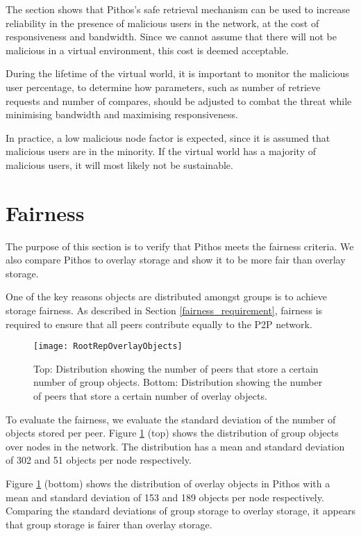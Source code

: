 The section shows that Pithos's safe retrieval mechanism can be used to increase reliability in the presence of malicious users in the network, at the cost of responsiveness and bandwidth. Since we cannot assume that there will not be malicious in a virtual environment, this cost is deemed acceptable.

During the lifetime of the virtual world, it is important to monitor the malicious user percentage, to determine how parameters, such as number of retrieve requests and number of compares, should be adjusted to combat the threat while minimising bandwidth and maximising responsiveness.

In practice, a low malicious node factor is expected, since it is assumed that malicious users are in the minority. If the virtual world has a majority of malicious users, it will most likely not be sustainable.

\section{Fairness}

The purpose of this section is to verify that Pithos meets the fairness criteria. We also compare Pithos to overlay storage and show it to be more fair than overlay storage.

One of the key reasons objects are distributed amongst groups is to achieve storage fairness. As described in Section \ref{fairness_requirement}, fairness is required to ensure that all peers contribute equally to the P2P network.

\begin{figure}[htbp]
 \centering
 \texttt{[image: RootRepOverlayObjects]}
 \caption{Top: Distribution showing the number of peers that store a certain number of group objects. Bottom: Distribution showing the number of peers that store a certain number of overlay objects.}
 \label{fig_group_overlay_objects}
\end{figure}
%
To evaluate the fairness, we evaluate the standard deviation of the number of objects stored per peer. Figure \ref{fig_group_overlay_objects} (top) shows the distribution of group objects over nodes in the network. The distribution has a mean and standard deviation of 302 and 51 objects per node respectively.

Figure \ref{fig_group_overlay_objects} (bottom) shows the distribution of overlay objects in Pithos with a mean and standard deviation of 153 and 189 objects per node respectively. Comparing the standard deviations of group storage to overlay storage, it appears that group storage is fairer than overlay storage.

